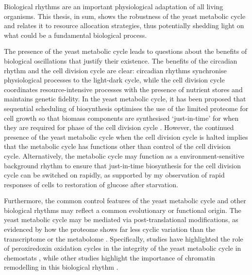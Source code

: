 Biological rhythms are an important physiological adaptation of all living organisms.
This thesis, in sum, shows the robustness of the yeast metabolic cycle and relates it to resource allocation strategies, thus potentially shedding light on what could be a fundamental biological process.

The presence of the yeast metabolic cycle leads to questions about the benefits of biological oscillations that justify their existence.
The benefits of the circadian rhythm and the cell division cycle are clear: circadian rhythms synchronise physiological processes to the light-dark cycle, while the cell division cycle coordinates resource-intensive processes with the presence of nutrient stores and maintains genetic fidelity.
In the yeast metabolic cycle, it has been proposed that sequential scheduling of biosynthesis optimises the use of the limited proteome for cell growth \parencite{oneillEukaryoticCellBiology2020,takhaveevTemporalSegregationBiosynthetic2023} so that biomass components are synthesised `just-in-time' for when they are required for phase of the cell division cycle \parencite{zylstraMetabolicDynamicsCell2022}.
However, the continued presence of the yeast metabolic cycle when the cell division cycle is halted implies that the metabolic cycle has functions other than control of the cell division cycle.
Alternatively, the metabolic cycle may function as a environment-sensitive background rhythm to ensure that just-in-time biosynthesis for the cell division cycle can be switched on rapidly, as supported by my observation of rapid responses of cells to restoration of glucose after starvation.

Furthermore, the common control features of the yeast metabolic cycle and other biological rhythms may reflect a common evolutionary or functional origin.
The yeast metabolic cycle may be mediated via post-translational modifications, as evidenced by how the proteome shows far less cyclic variation than the transcriptome \parencite{felthamTranscriptionalChangesAre2020} or the metabolome \parencite{oneillEukaryoticCellBiology2020}.
Specifically, studies have highlighted the role of peroxiredoxin oxidation cycles in the integrity of the yeast metabolic cycle in chemostats \parencite{caustonMetabolicCyclesYeast2015,amponsahPeroxiredoxinsCoupleMetabolism2021}, while other studies highlight the importance of chromatin remodelling in this biological rhythm \parencite{nocettiNucleosomeRepositioningUnderlies2016,gowansINO80ChromatinRemodeling2018}.

